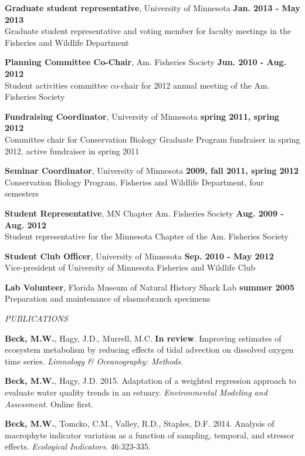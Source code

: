 \documentclass[letterpaper,12pt]{article}
\newcommand{\sectitle}[1]{\vspace{\baselineskip} \centerline{\large{\textit{#1}}}}
\begin{document}
{\bf Graduate student representative}, University of Minnesota \hfill {\bf Jan. 2013 - May 2013} \\
Graduate student representative and voting member for faculty meetings in the Fisheries and Wildlife Department

{\bf Planning Committee Co-Chair}, Am. Fisheries Society \hfill {\bf Jun. 2010 - Aug. 2012} \\
Student activities committee co-chair for 2012 annual meeting of the Am. Fisheries Society

{\bf Fundraising Coordinator}, University of Minnesota \hfill {\bf spring 2011, spring 2012} \\
Committee chair for Conservation Biology Graduate Program fundraiser in spring 2012, active fundraiser in spring 2011

{\bf Seminar Coordinator}, University of Minnesota \hfill {\bf 2009, fall 2011, spring 2012} \\
Conservation Biology Program, Fisheries and Wildlife Department, four semesters

{\bf Student Representative}, MN Chapter Am. Fisheries Society \hfill {\bf Aug. 2009 - Aug. 2012} \\
Student representative for the Minnesota Chapter of the Am. Fisheries Society

{\bf Student Club Officer}, University of Minnesota \hfill {\bf Sep. 2010 - May 2012} \\
Vice-president of University of Minnesota Fisheries and Wildlife Club

{\bf Lab Volunteer}, Florida Museum of Natural History Shark Lab \hfill {\bf summer 2005} \\
Preparation and maintenance of elasmobranch specimens

\sectitle{PUBLICATIONS}

\textbf{Beck, M.W.}, Hagy, J.D., Murrell, M.C. {\bf In review}. Improving estimates of ecosystem metabolism by reducing effects of tidal advection on dissolved oxygen time series. \textit{Limnology \& Oceanography: Methods}.

\textbf{Beck, M.W.}, Hagy, J.D. 2015. Adaptation of a weighted regression approach to evaluate water quality trends in an estuary. \textit{Environmental Modeling and Assessment}. Online first.

\textbf{Beck, M.W.}, Tomcko, C.M., Valley, R.D., Staples, D.F. 2014. Analysis of macrophyte indicator variation as a function of sampling, temporal, and stressor effects. \textit{Ecological Indicators}. 46:323-335.
\end{document}

